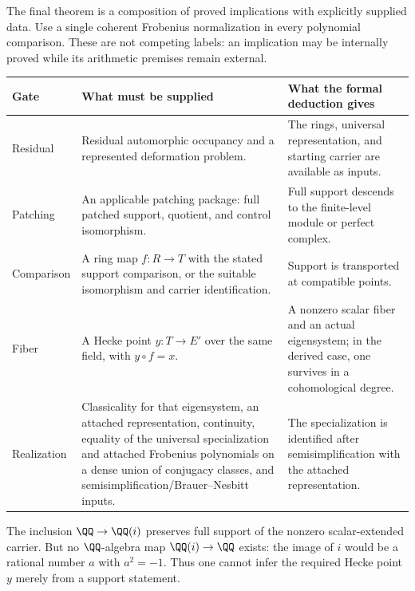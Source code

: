 
The final theorem is a composition of proved implications with explicitly supplied data. Use a single coherent Frobenius normalization in every polynomial comparison. These are not competing labels: an implication may be internally proved while its arithmetic premises remain external.

{\small
\begin{tabularx}{\linewidth}{@{}p{.13\linewidth}YY@{}}\toprule
\textbf{Gate} & \textbf{What must be supplied} & \textbf{What the formal deduction gives}\\\midrule
Residual & Residual automorphic occupancy and a represented deformation problem. & The rings, universal representation, and starting carrier are available as inputs.\\
Patching & An applicable patching package: full patched support, quotient, and control isomorphism. & Full support descends to the finite-level module or perfect complex.\\
Comparison & A ring map $f:R\to T$ with the stated support comparison, or the suitable isomorphism and carrier identification. & Support is transported at compatible points.\\
Fiber & A Hecke point $y:T\to E'$ over the same field, with $y\circ f=x$. & A nonzero scalar fiber and an actual eigensystem; in the derived case, one survives in a cohomological degree.\\
Realization & Classicality for that eigensystem, an attached representation, continuity, equality of the universal specialization and attached Frobenius polynomials on a dense union of conjugacy classes, and semisimplification/Brauer--Nesbitt inputs. & The specialization is identified after semisimplification with the attached representation.\\\bottomrule
\end{tabularx}}

The inclusion $\QQ\to\QQ(i)$ preserves full support of the nonzero scalar-extended carrier. But no $\QQ$-algebra map $\QQ(i)\to\QQ$ exists: the image of $i$ would be a rational number $a$ with $a^2=-1$. Thus one cannot infer the required Hecke point $y$ merely from a support statement.

